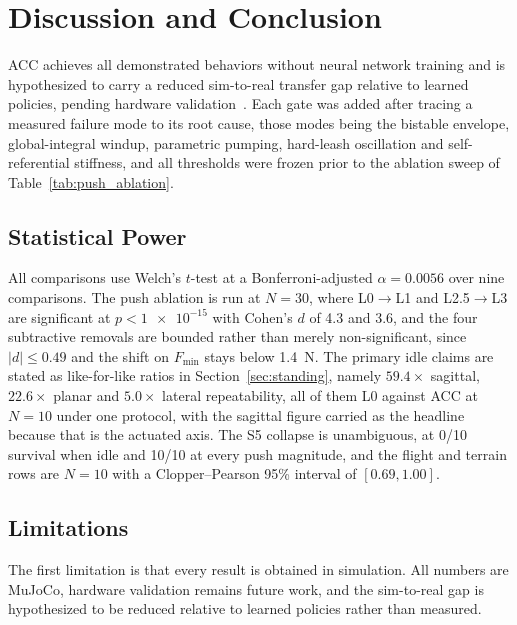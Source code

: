 \documentclass[a4paper,fleqn]{cas-dc}
\begin{document}
\section{Discussion and Conclusion}
\label{sec:discussion}

ACC achieves all demonstrated behaviors without neural network training and is
hypothesized to carry a reduced sim-to-real transfer gap relative to learned
policies, pending hardware validation~\cite{grimminger2020torque}. Each gate was
added after tracing a measured failure mode to its root cause, those modes being
the bistable envelope, global-integral windup, parametric pumping, hard-leash
oscillation and self-referential stiffness, and all thresholds were frozen prior
to the ablation sweep of Table~\ref{tab:push_ablation}.

\subsection{Statistical Power}

All comparisons use Welch's $t$-test at a Bonferroni-adjusted
$\alpha{=}0.0056$ over nine comparisons. The push ablation is run at $N{=}30$,
where L0$\rightarrow$L1 and L2.5$\rightarrow$L3 are significant at
$p{<}\num{1e-15}$ with Cohen's $d$ of \num{4.3} and \num{3.6}, and the four
subtractive removals are bounded rather than merely non-significant, since
$|d|{\le}0.49$ and the shift on $F_{\min}$ stays below \SI{1.4}{N}. The primary
idle claims are stated as like-for-like ratios in Section~\ref{sec:standing},
namely $59.4{\times}$ sagittal, $22.6{\times}$ planar and $5.0{\times}$ lateral
repeatability, all of them L0 against ACC at $N{=}10$ under one protocol, with
the sagittal figure carried as the headline because that is the actuated axis.
The S5 collapse is unambiguous, at \num{0}/\num{10} survival when idle and
\num{10}/\num{10} at every push magnitude, and the flight and terrain rows are
$N{=}10$ with a Clopper--Pearson 95\% interval of $[0.69,1.00]$.

\subsection{Limitations}

The first limitation is that every result is obtained in simulation. All numbers
are MuJoCo, hardware validation remains future work, and the sim-to-real gap is
hypothesized to be reduced relative to learned policies rather than measured.
\end{document}
